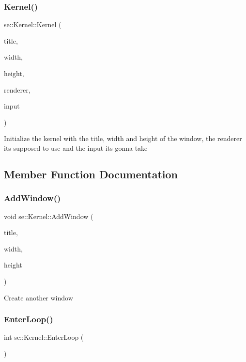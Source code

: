 \subsubsection{\texorpdfstring{Kernel()}{Kernel()}}
{\footnotesize\ttfamily se\+::\+Kernel\+::\+Kernel (\begin{DoxyParamCaption}\item[{const std\+::string \&}]{title,  }\item[{int}]{width,  }\item[{int}]{height,  }\item[{\mbox{\hyperlink{classse_1_1_abstract_renderer}{Abstract\+Renderer}} $\ast$}]{renderer,  }\item[{\mbox{\hyperlink{classse_1_1_input}{Input}} $\ast$}]{input }\end{DoxyParamCaption})}

Initialize the kernel with the title, width and height of the window, the renderer it\textquotesingle{}s supposed to use and the input it\textquotesingle{}s gonna take 

\subsection{Member Function Documentation}
\mbox{\label{classse_1_1_kernel_aafcef2223ca597327876f4f444d3521b}} 
\subsubsection{\texorpdfstring{Add\+Window()}{AddWindow()}}
{\footnotesize\ttfamily void se\+::\+Kernel\+::\+Add\+Window (\begin{DoxyParamCaption}\item[{const std\+::string \&}]{title,  }\item[{int}]{width,  }\item[{int}]{height }\end{DoxyParamCaption})}

Create another window \mbox{\label{classse_1_1_kernel_a1faeac6fce02ccd7ff76d94ad78e0754}} 
\subsubsection{\texorpdfstring{Enter\+Loop()}{EnterLoop()}}
{\footnotesize\ttfamily int se\+::\+Kernel\+::\+Enter\+Loop (\begin{DoxyParamCaption}{ }\end{DoxyParamCaption})}


